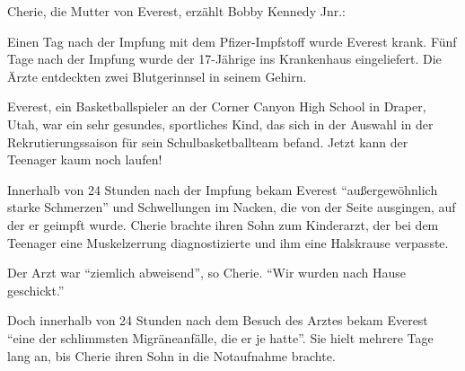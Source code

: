 Cherie, die Mutter von Everest, erzählt Bobby Kennedy Jnr.:

Einen Tag nach der Impfung mit dem Pfizer-Impfstoff wurde Everest krank. Fünf
Tage nach der Impfung wurde der 17-Jährige ins Krankenhaus eingeliefert. Die
Ärzte entdeckten zwei Blutgerinnsel in seinem Gehirn.

Everest, ein Basketballspieler an der Corner Canyon High School in Draper, Utah,
war ein sehr gesundes, sportliches Kind, das sich in der Auswahl in der
Rekrutierungssaison für sein Schulbasketballteam befand. Jetzt kann der Teenager
kaum noch laufen!

Innerhalb von 24 Stunden nach der Impfung bekam Everest ``außergewöhnlich starke
Schmerzen'' und Schwellungen im Nacken, die von der Seite ausgingen, auf der er
geimpft wurde. Cherie brachte ihren Sohn zum Kinderarzt, der bei dem Teenager
eine Muskelzerrung diagnostizierte und ihm eine Halskrause verpasste.

Der Arzt war ``ziemlich abweisend'', so Cherie. ``Wir wurden nach Hause
geschickt.''

Doch innerhalb von 24 Stunden nach dem Besuch des Arztes bekam Everest ``eine
der schlimmsten Migräneanfälle, die er je hatte''. Sie hielt mehrere Tage lang
an, bis Cherie ihren Sohn in die Notaufnahme brachte.
